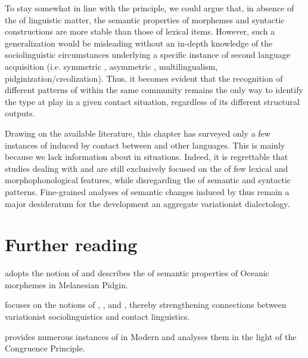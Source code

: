\documentclass[output=paper]{langsci/langscibook}
\begin{document}
To stay somewhat in line with the  principle, we could argue that, in absence of the  of linguistic matter, the semantic properties of morphemes and syntactic constructions are more stable than those of lexical items. However, such a generalization would be misleading without an in-depth knowledge of the sociolinguistic circumstances underlying a specific instance of second language acquisition (i.e. symmetric , asymmetric , multilingualism, pidginization/creolization). Thus, it becomes evident that the recognition of different patterns of  within the same community remains the only way to identify the  type at play in a given contact situation, regardless of its different structural outputs.  

Drawing on the available literature, this chapter has surveyed only a few instances of   induced by contact between  and other languages. This is mainly because we lack information about  in  situations. Indeed, it is regrettable that studies dealing with  and   are still exclusively focused on the  of few lexical and morphophonological features, while disregarding the  of semantic and syntactic patterns. Fine-grained analyses of semantic changes induced by  thus remain a major desideratum for the development an aggregate variationist  dialectology.  

\section*{Further reading}
\begin{furtherreading}
\item \citet{Keesing1988} adopts the notion of  and describes the  of semantic properties of Oceanic morphemes in Melanesian Pidgin.
\item \citet{Meyerhoff2009} focuses on the notions of , , and , thereby strengthening connections between variationist sociolinguistics and contact linguistics.
\item \citet{Zuckermann2009} provides numerous instances of  in Modern  and analyses them in the light of the Congruence Principle.
\end{furtherreading}
\end{document}
